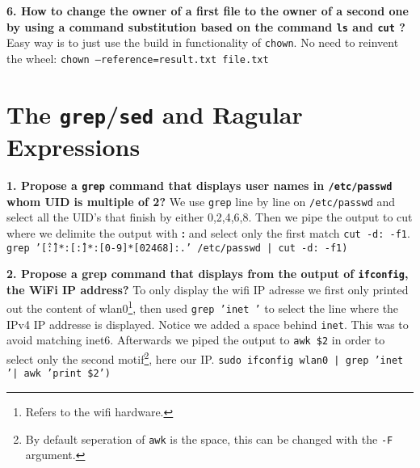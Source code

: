 \documentclass[a4paper,oneside,onecolumn]{article}
\newcommand{\code}[1]{\colorbox{codegray}{\texttt{#1}}}
\begin{document}
\noindent
\textbf{6. How to change the owner of a first file to the owner of a second one by using a command substitution based on the command \code{ls} and \code{cut} ?}
\newline
\newline
Easy way is to just use the build in functionality of \code{chown}. No need to reinvent the wheel:
\newline
\code{chown --reference=result.txt file.txt}

\section*{The \code{grep}/\code{sed} and Ragular Expressions}

\noindent 
\textbf{1. Propose a \code{grep} command that displays user names in \texttt{/etc/passwd}
whom UID is multiple of 2?}
\newline
\newline
We use \code{grep} line by line on \texttt{/etc/passwd} and select all the UID's that finish by either 0,2,4,6,8. Then we pipe the output to cut where we delimite the output with \textbf{:} and select only the first match \code{cut -d: -f1}.
\newline
\newline
\code{grep '\^[\^:]*:[\^:]*:[0-9]*[02468]:.' /etc/passwd | cut -d: -f1)}

\noindent
\textbf{2. Propose a grep command that displays from the output of \code{ifconfig}, the WiFi IP address?}
\newline
\newline
To only display the wifi IP adresse we first only printed out the content of wlan0\footnote{Refers to the wifi hardware.}, then used \code{grep 'inet '} to select the line where the IPv4 IP addresse is displayed. Notice we added a space behind \texttt{inet}. This was to avoid matching inet6. Afterwards we piped the output to \code{awk \$2} in order to select only the second motif\footnote{By default seperation of \code{awk} is the space, this can be changed with the \code{-F} argument.}, here our IP.
\newline
\newline
\code{sudo ifconfig wlan0 | grep 'inet '| awk '{print \$2}')}

\noindent
\end{document}
